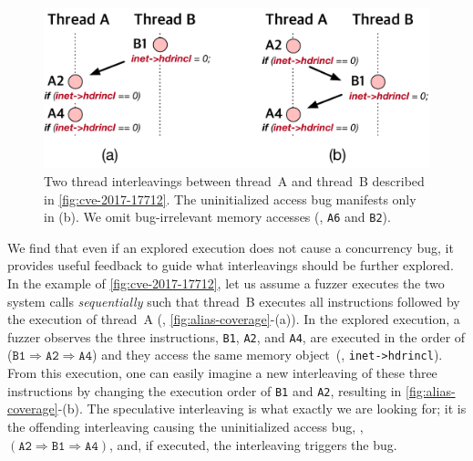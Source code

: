 \begin{figure}[t]
  \centering
  \includegraphics[width=0.8\linewidth]{fig/alias-coverage.pdf}
  \caption{Two thread interleavings between thread~A and thread~B
    described in \autoref{fig:cve-2017-17712}.
    The uninitialized access bug manifests only in (b).
    We omit bug-irrelevant memory accesses (\ie, \texttt{A6} and
    \texttt{B2}).}
  \label{fig:alias-coverage}
  \vspace{-8pt}
\end{figure}


%
We find that even if an explored execution does not cause a
concurrency bug, it provides useful feedback to guide what
interleavings should be further explored.
%
In the example of \autoref{fig:cve-2017-17712}, let us assume a fuzzer
executes the two system calls \textit{sequentially} such that thread~B
executes all instructions followed by the execution of thread~A (\ie,
\autoref{fig:alias-coverage}-(a)).  In the explored execution, a
fuzzer observes the three instructions, \texttt{B1}, \texttt{A2}, and
\texttt{A4}, are executed in the order of
($\texttt{B1} \Rightarrow \texttt{A2} \Rightarrow \texttt{A4}$) and
they access the same memory object~(\ie, \texttt{inet->hdrincl}).
%
From this execution, one can easily imagine a new interleaving of
these three instructions by changing the execution order of
\texttt{B1} and \texttt{A2}, resulting in
\autoref{fig:alias-coverage}-(b).
%
The speculative interleaving is what exactly we are looking for; it is
the offending interleaving causing the uninitialized access bug, \eg,
$(\texttt{A2} \Rightarrow \texttt{B1} \Rightarrow \texttt{A4})$, and,
if executed, the interleaving triggers the bug.

